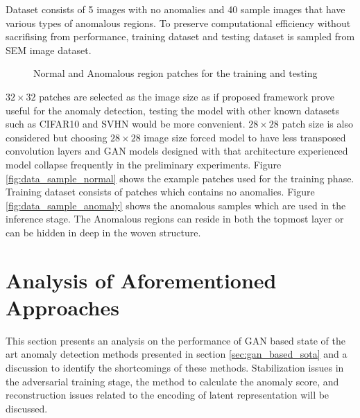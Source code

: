 Dataset consists of 5 images with no anomalies and 40 sample images that have various types of anomalous regions. To preserve 
computational efficiency without sacrifising from performance, training dataset and testing dataset is sampled from SEM image dataset.
\begin{figure}[h!]
	\hspace*{\fill}%
	\caption{Normal and Anomalous region patches for the training and testing}
	\label{fig:data_samples}
\end{figure}

$32 \times 32$ patches are selected as the image size as if proposed framework prove useful for the anomaly detection, 
testing the model with other known datasets such as CIFAR10 \cite{cifar10} and SVHN \cite{Netzer2011ReadingDI} would be more convenient. 
$28 \times 28$ patch size is also considered but choosing $28 \times 28$ image size forced model to have less transposed convolution 
layers and GAN models designed with that architecture experienced model collapse frequently in the preliminary experiments.
 Figure \ref{fig:data_sample_normal} shows the example patches used for the 
training phase. Training dataset consists of patches which contains no anomalies. Figure \ref{fig:data_sample_anomaly} 
shows the anomalous samples which are used in the inference stage. The Anomalous regions can reside in both the topmost layer
or can be hidden in deep in the woven structure.
\section{Analysis of Aforementioned Approaches}
\label{sec:analysis_before}

This section presents an analysis on the performance of GAN based state of the art anomaly detection methods 
presented in section \ref{sec:gan_based_sota} and a discussion to identify the shortcomings of these methods. 
Stabilization issues in the adversarial training stage, the method to calculate the anomaly score, and reconstruction 
issues related to the encoding of latent representation will be discussed.


